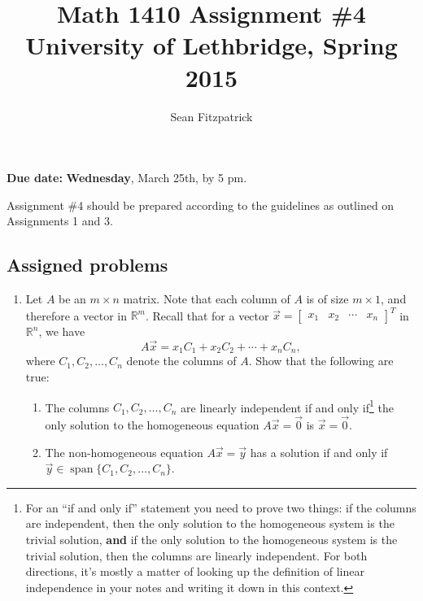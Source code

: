\documentclass[letterpaper,12pt]{article}
\title{Math 1410 Assignment \#4\\University of Lethbridge, Spring 2015}
\author{Sean Fitzpatrick}
\newcommand{\R}{\mathbb{R}}
\begin{document}
 \maketitle

{\bf Due date:} {\bf Wednesday}, March 25th, by 5 pm.

\bigskip

Assignment \#4 should be prepared according to the guidelines as outlined on Assignments 1 and 3.

\subsection*{Assigned problems}
\begin{enumerate}
\item Let $A$ be an $m\times n$ matrix. Note that each column of $A$ is of size $m\times 1$, and therefore a vector in $\R^m$. Recall that for a vector $\vec{x} = \begin{bmatrix}x_1&x_2&\cdots &x_n\end{bmatrix}^T$ in $\R^n$, we have
\[
 A\vec{x} = x_1C_1+x_2C_2+\cdots +x_nC_n,
\]
where $C_1,C_2,\ldots, C_n$ denote the columns of $A$. Show that the following are true:
\begin{enumerate}
 \item The columns $C_1,C_2,\ldots, C_n$ are linearly independent if and only if\footnote{For an ``if and only if'' statement you need to prove two things: if the columns are independent, then the only solution to the homogeneous system is the trivial solution, {\bf and} if the only solution to the homogeneous system is the trivial solution, then the columns are linearly independent. For both directions, it's mostly a matter of looking up the definition of linear independence in your notes and writing it down in this context.} the only solution to the homogeneous equation $A\vec{x}=\vec{0}$ is $\vec{x}=\vec{0}$.
 \item The non-homogeneous equation $A\vec{x}=\vec{y}$ has a solution if and only if\\ $\vec{y}\in\operatorname{span}\{C_1,C_2,\ldots, C_n\}$.
\end{enumerate}


\end{enumerate}
\end{document}
